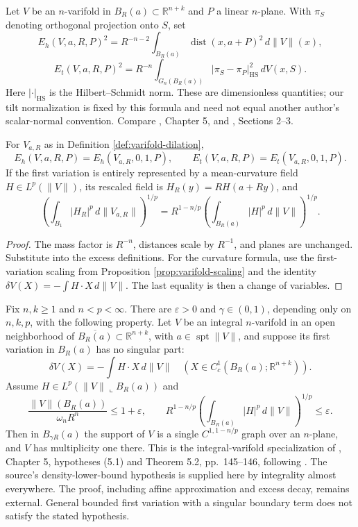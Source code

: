 \begin{definition}\label{def:varifold-excess}
Let $V$ be an $n$-varifold in $B_R(a)\subset\mathbb R^{n+k}$ and $P$ a linear $n$-plane. With $\pi_S$ denoting orthogonal projection onto $S$, set
\[
 E_h(V,a,R,P)^2=R^{-n-2}\int_{B_R(a)}\operatorname{dist}(x,a+P)^2\,d\|V\|(x),
\]
\[
 E_t(V,a,R,P)^2=R^{-n}\int_{G_n(B_R(a))}|\pi_S-\pi_P|_{\mathrm{HS}}^2\,dV(x,S).
\]
Here $|\cdot|_{\mathrm{HS}}$ is the Hilbert--Schmidt norm. These are dimensionless quantities; our tilt normalization is fixed by this formula and need not equal another author's scalar-normal convention. Compare \cite{Sim18}, Chapter 5, and \cite{Minter}, Sections 2--3.
\end{definition}

\begin{proposition}\label{prop:excess-scaling}
For $V_{a,R}$ as in Definition \ref{def:varifold-dilation},
\[
 E_h(V,a,R,P)=E_h(V_{a,R},0,1,P),\qquad
 E_t(V,a,R,P)=E_t(V_{a,R},0,1,P).
\]
If the first variation is entirely represented by a mean-curvature field $H\in L^p(\|V\|)$, its rescaled field is $H_R(y)=R H(a+Ry)$, and
\[
 \left(\int_{B_1}|H_R|^p\,d\|V_{a,R}\|\right)^{1/p}
 =R^{1-n/p}\left(\int_{B_R(a)}|H|^p\,d\|V\|\right)^{1/p}.
\]
\end{proposition}
\begin{proof}
The mass factor is $R^{-n}$, distances scale by $R^{-1}$, and planes are unchanged. Substitute into the excess definitions. For the curvature formula, use the first-variation scaling from Proposition \ref{prop:varifold-scaling} and the identity $\delta V(X)=-\int H\cdot X\,d\|V\|$. The last equality is then a change of variables.
\end{proof}

\begin{theorem}\label{thm:allard-lp}
Fix $n,k\geq1$ and $n<p<\infty$. There are $\varepsilon>0$ and $\gamma\in(0,1)$, depending only on $n,k,p$, with the following property. Let $V$ be an integral $n$-varifold in an open neighborhood of $\overline{B_R(a)}\subset\mathbb R^{n+k}$, with $a\in\operatorname{spt}\|V\|$, and suppose its first variation in $B_R(a)$ has no singular part:
\[
 \delta V(X)=-\int H\cdot X\,d\|V\|\quad
 (X\in C_c^1(B_R(a);\mathbb R^{n+k})).
\]
Assume $H\in L^p(\|V\|\llcorner B_R(a))$ and
\[
 \frac{\|V\|(B_R(a))}{\omega_n R^n}\leq1+\varepsilon,
 \qquad R^{1-n/p}\left(\int_{B_R(a)}|H|^p\,d\|V\|\right)^{1/p}\leq\varepsilon.
\]
Then in $B_{\gamma R}(a)$ the support of $V$ is a single $C^{1,1-n/p}$ graph over an $n$-plane, and $V$ has multiplicity one there. This is the integral-varifold specialization of \cite{Sim18}, Chapter 5, hypotheses (5.1) and Theorem 5.2, pp.~145--146, following \cite{Allard72}. The source's density-lower-bound hypothesis is supplied here by integrality almost everywhere. The proof, including affine approximation and excess decay, remains external. General bounded first variation with a singular boundary term does not satisfy the stated hypothesis.
\end{theorem}

